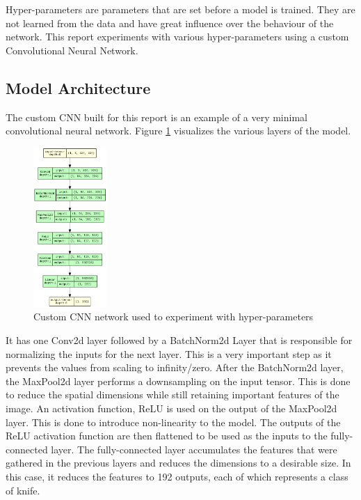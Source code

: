 \documentclass[10pt,twocolumn,letterpaper]{article}
\begin{document}
Hyper-parameters are parameters that are set before a model is trained. They are not learned from the data and have
great influence over the behaviour of the network. This report experiments with various hyper-parameters using a
custom Convolutional Neural Network.

\subsection{Model Architecture}

The custom CNN built for this report is an example of a very minimal convolutional neural network. Figure
\ref{fig:custom_cnn_chart} visualizes the various layers of the model.

\begin{figure}[htbp]
  \begin{center}
    \includegraphics[width=0.247\textwidth]{./assets/CustomCNN_visualization.png}
    \captionsetup{justification=centering}
    \caption{Custom CNN network used to experiment with hyper-parameters}
    \label{fig:custom_cnn_chart}
  \end{center}
\end{figure}

It has one Conv2d layer followed by a
BatchNorm2d Layer that is responsible for normalizing the inputs for the next layer. This is a very important step
as it prevents the values from scaling to infinity/zero. After the BatchNorm2d layer, the MaxPool2d layer performs a
downsampling on the input tensor. This is done to reduce the spatial dimensions while still retaining important
features of the image. An activation function, ReLU is used on the output of the MaxPool2d layer. This is done to
introduce non-linearity to the model. The outputs of the ReLU activation function are then flattened to be used as the
inputs to the fully-connected layer. The fully-connected layer accumulates the features that were gathered in the
previous layers and reduces the dimensions to a desirable size. In this case, it reduces the features to 192 outputs,
each of which represents a class of knife.
\end{document}
